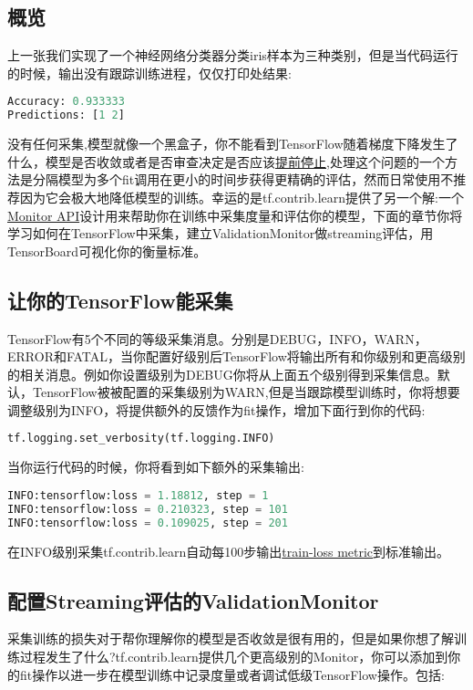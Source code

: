 \subsection{概览}
上一张我们实现了一个神经网络分类器分类iris样本为三种类别，但是当代码运行的时候，输出没有跟踪训练进程，仅仅打印处结果:
\begin{lstlisting}[language=Python]
Accuracy: 0.933333
Predictions: [1 2]
\end{lstlisting}
没有任何采集,模型就像一个黑盒子，你不能看到TensorFlow随着梯度下降发生了什么，模型是否收敛或者是否审查决定是否应该\href{https://en.wikipedia.org/wiki/Early_stopping}{提前停止},处理这个问题的一个方法是分隔模型为多个fit调用在更小的时间步获得更精确的评估，然而日常使用不推荐因为它会极大地降低模型的训练。幸运的是tf.contrib.learn提供了另一个解:一个\href{https://www.tensorflow.org/api_docs/python/tf/contrib/learn/monitors}{Monitor API}设计用来帮助你在训练中采集度量和评估你的模型，下面的章节你将学习如何在TensorFlow中采集，建立ValidationMonitor做streaming评估，用TensorBoard可视化你的衡量标准。
\subsection{让你的TensorFlow能采集}
TensorFlow有5个不同的等级采集消息。分别是DEBUG，INFO，WARN，ERROR和FATAL，当你配置好级别后TensorFlow将输出所有和你级别和更高级别的相关消息。例如你设置级别为DEBUG你将从上面五个级别得到采集信息。默认，TensorFlow被被配置的采集级别为WARN,但是当跟踪模型训练时，你将想要调整级别为INFO，将提供额外的反馈作为fit操作，增加下面行到你的代码:
\begin{lstlisting}[language=Python]
tf.logging.set_verbosity(tf.logging.INFO)
\end{lstlisting}
当你运行代码的时候，你将看到如下额外的采集输出:
\begin{lstlisting}[language=Python]
INFO:tensorflow:loss = 1.18812, step = 1
INFO:tensorflow:loss = 0.210323, step = 101
INFO:tensorflow:loss = 0.109025, step = 201
\end{lstlisting}
在INFO级别采集tf.contrib.learn自动每100步输出\href{}{train-loss metric}到标准输出。
\subsection{配置Streaming评估的ValidationMonitor}
采集训练的损失对于帮你理解你的模型是否收敛是很有用的，但是如果你想了解训练过程发生了什么?tf.contrib.learn提供几个更高级别的Monitor，你可以添加到你的fit操作以进一步在模型训练中记录度量或者调试低级TensorFlow操作。包括:

